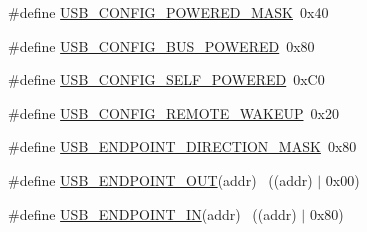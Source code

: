 \begin{DoxyCompactItemize}
\item 
\#define \hyperlink{group__USBD__Core_gafdd4f846b5497985c182a1a090d99729}{U\+S\+B\+\_\+\+C\+O\+N\+F\+I\+G\+\_\+\+P\+O\+W\+E\+R\+E\+D\+\_\+\+M\+A\+SK}~0x40
\item 
\#define \hyperlink{group__USBD__Core_ga63c0a08ce70650c3c677ab523a45a0bb}{U\+S\+B\+\_\+\+C\+O\+N\+F\+I\+G\+\_\+\+B\+U\+S\+\_\+\+P\+O\+W\+E\+R\+ED}~0x80
\item 
\#define \hyperlink{group__USBD__Core_ga8c322771b797c09e3066a388b46e9ef9}{U\+S\+B\+\_\+\+C\+O\+N\+F\+I\+G\+\_\+\+S\+E\+L\+F\+\_\+\+P\+O\+W\+E\+R\+ED}~0x\+C0
\item 
\#define \hyperlink{group__USBD__Core_ga7b28a766a8a916fae421d52fbedd2cba}{U\+S\+B\+\_\+\+C\+O\+N\+F\+I\+G\+\_\+\+R\+E\+M\+O\+T\+E\+\_\+\+W\+A\+K\+E\+UP}~0x20
\end{DoxyCompactItemize}
\begin{DoxyCompactItemize}
\item 
\#define \hyperlink{group__USBD__Core_gab7544c5b8cf975839422c1ce29d4c5cb}{U\+S\+B\+\_\+\+E\+N\+D\+P\+O\+I\+N\+T\+\_\+\+D\+I\+R\+E\+C\+T\+I\+O\+N\+\_\+\+M\+A\+SK}~0x80
\item 
\#define \hyperlink{group__USBD__Core_ga91482cd8f4ffa0d76ae673c08139b045}{U\+S\+B\+\_\+\+E\+N\+D\+P\+O\+I\+N\+T\+\_\+\+O\+UT}(addr)                              ~((addr) $\vert$ 0x00)
\item 
\#define \hyperlink{group__USBD__Core_gaea6d13f333ab253fbffe04dabb4cb76f}{U\+S\+B\+\_\+\+E\+N\+D\+P\+O\+I\+N\+T\+\_\+\+IN}(addr)                                ~((addr) $\vert$ 0x80)
\end{DoxyCompactItemize}
